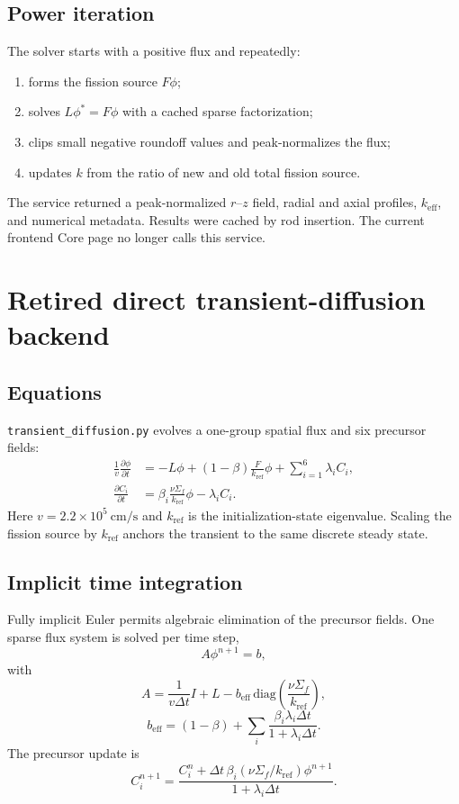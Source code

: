 \documentclass[11pt]{article}
\begin{document}
\subsection{Power iteration}

The solver starts with a positive flux and repeatedly:
\begin{enumerate}
  \item forms the fission source $F\phi$;
  \item solves $L\phi^*=F\phi$ with a cached sparse factorization;
  \item clips small negative roundoff values and peak-normalizes the flux;
  \item updates $k$ from the ratio of new and old total fission source.
\end{enumerate}

The service returned a peak-normalized $r$--$z$ field, radial and axial
profiles, $k_{\mathrm{eff}}$, and numerical metadata.  Results were cached by
rod insertion.  The current frontend Core page no longer calls this service.

\section{Retired direct transient-diffusion backend}

\subsection{Equations}

\texttt{transient\_diffusion.py} evolves a one-group spatial flux and six
precursor fields:
\begin{align}
\frac{1}{v}\frac{\partial\phi}{\partial t}
&=-L\phi+(1-\beta)\frac{F}{k_{\mathrm{ref}}}\phi
  +\sum_{i=1}^6\lambda_iC_i,\\
\frac{\partial C_i}{\partial t}
&=\beta_i\frac{\nu\Sigma_f}{k_{\mathrm{ref}}}\phi-\lambda_iC_i.
\end{align}
Here $v=2.2\times10^5\ \mathrm{cm/s}$ and $k_{\mathrm{ref}}$ is the
initialization-state eigenvalue.  Scaling the fission source by
$k_{\mathrm{ref}}$ anchors the transient to the same discrete steady state.

\subsection{Implicit time integration}

Fully implicit Euler permits algebraic elimination of the precursor fields.
One sparse flux system is solved per time step,
\[
A\phi^{n+1}=b,
\]
with
\[
A=\frac{1}{v\Delta t}I+L
-b_{\mathrm{eff}}\,\mathrm{diag}
\left(\frac{\nu\Sigma_f}{k_{\mathrm{ref}}}\right),
\]
\[
b_{\mathrm{eff}}=(1-\beta)+
\sum_i\frac{\beta_i\lambda_i\Delta t}{1+\lambda_i\Delta t}.
\]
The precursor update is
\[
C_i^{n+1}=
\frac{C_i^n+\Delta t\,\beta_i
(\nu\Sigma_f/k_{\mathrm{ref}})\phi^{n+1}}
{1+\lambda_i\Delta t}.
\]
\end{document}
